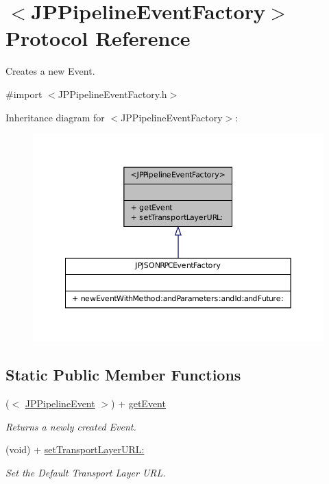 \hypertarget{a00024}{
\section{$<$JPPipelineEventFactory$>$ Protocol Reference}
\label{a00024}
}


Creates a new Event.  




{\ttfamily \#import $<$JPPipelineEventFactory.h$>$}



Inheritance diagram for $<$JPPipelineEventFactory$>$:\nopagebreak
\begin{figure}[H]
\begin{center}
\leavevmode
\includegraphics[width=352pt]{a00132}
\end{center}
\end{figure}
\subsection*{Static Public Member Functions}
\begin{DoxyCompactItemize}
\item 
\hypertarget{a00024_ad0137ddf845685a18b6c564de61f5037}{
($<$ \hyperlink{a00023}{JPPipelineEvent} $>$) + \hyperlink{a00024_ad0137ddf845685a18b6c564de61f5037}{getEvent}}
\label{a00024_ad0137ddf845685a18b6c564de61f5037}

\begin{DoxyCompactList}\small\item\em Returns a newly created Event. \item\end{DoxyCompactList}\item 
\hypertarget{a00024_a3ce6ec043e32712b94a7559f1a1aaf29}{
(void) + \hyperlink{a00024_a3ce6ec043e32712b94a7559f1a1aaf29}{setTransportLayerURL:}}
\label{a00024_a3ce6ec043e32712b94a7559f1a1aaf29}

\begin{DoxyCompactList}\small\item\em Set the Default Transport Layer URL. \item\end{DoxyCompactList}\end{DoxyCompactItemize}


